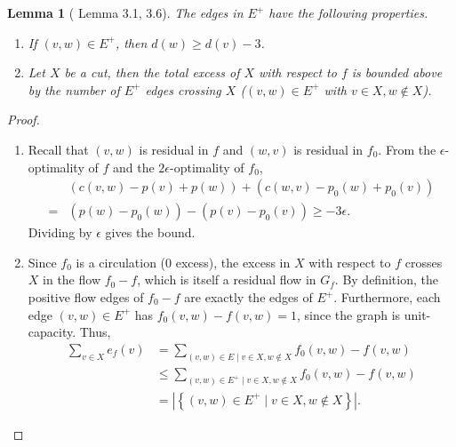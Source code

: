 \documentclass[11pt]{article}
\theoremstyle{plain}
\newtheorem{lemma}{Lemma}
\begin{document}
\begin{lemma}[\cite{DBLP:journals/mst/GoldbergHKT17} Lemma 3.1, 3.6]
\label{lemma:goldberg_3.1}
\label{lemma:goldberg_3.6}
	The edges in $E^+$ have the following properties.
	\begin{enumerate}
	\item \label{item:goldberg_3.1}
		If $(v, w) \in E^+$, then $d(w) \geq d(v) - 3$.

	\item \label{item:goldberg_3.6}
		Let $X$ be a cut, then the total excess of $X$ 
		with respect to $f$ is bounded above by the number of 
		$E^+$ edges crossing $X$ 
		($(v, w) \in E^+$ with $v \in X, w \not\in X$).
	\end{enumerate}
\end{lemma}
\begin{proof}
	\ 
	\begin{enumerate}
	\item Recall that $(v, w)$ is residual in $f$ and $(w, v)$ is residual in $f_0$.
		From the $\epsilon$-optimality of $f$ and the $2\epsilon$-optimality of $f_0$,
		\begin{equation*}
		\begin{aligned}
			& (c(v, w) - p(v) + p(w)) + (c(w, v) - p_0(w) + p_0(v)) \\
				= & (p(w) - p_0(w)) - (p(v) - p_0(v))
				\geq -3\epsilon.
		\end{aligned}
		\end{equation*}
		Dividing by $\epsilon$ gives the bound.

	\item Since $f_0$ is a circulation (0 excess), the excess in $X$ with respect to $f$
		crosses $X$ in the flow $f_0 - f$, which is itself a residual flow in $G_f$.
		By definition, the positive flow edges of $f_0 - f$ are exactly the edges of $E^+$.
		Furthermore, each edge $(v, w) \in E^+$ has $f_0(v, w) - f(v, w) = 1$,
		since the graph is unit-capacity.
		Thus, 
		\begin{equation*}
		\begin{aligned}
			\sum_{v \in X} e_f(v) 
				&= \sum_{(v, w) \in E \mid v \in X, w \not\in X} f_0(v, w) - f(v, w) \\
				&\leq \sum_{(v, w) \in E^+ \mid v \in X, w \not\in X} f_0(v, w) - f(v, w) \\
				&= \left|\left\{(v, w) \in E^+ \mid v \in X, w \not\in X\right\}\right|.
		\end{aligned}
		\end{equation*}
	\end{enumerate}
\end{proof}
\end{document}

